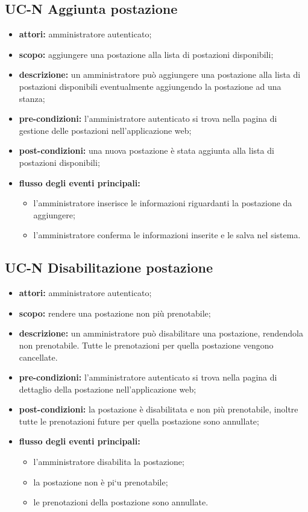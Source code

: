 \subsection{UC-N Aggiunta postazione}
\begin{itemize}
    \item \textbf{attori:} amministratore autenticato;
    \item \textbf{scopo:} aggiungere una postazione alla lista di postazioni disponibili;
    \item \textbf{descrizione:} un amministratore pu\`{o} aggiungere una postazione alla lista di postazioni disponibili eventualmente aggiungendo la postazione ad una stanza;
    \item \textbf{pre-condizioni:} l'amministratore autenticato si trova nella pagina di gestione delle postazioni nell'applicazione web;
    \item \textbf{post-condizioni:} una nuova postazione \`{e} stata aggiunta alla lista di postazioni disponibili;
    \item \textbf{flusso degli eventi principali:}
    \begin{itemize}
        \item l'amministratore inserisce le informazioni riguardanti la postazione da aggiungere;
        \item l'amministratore conferma le informazioni inserite e le salva nel sistema.
    \end{itemize}
\end{itemize}


\subsection{UC-N Disabilitazione postazione}
\begin{itemize}
    \item \textbf{attori:} amministratore autenticato;
    \item \textbf{scopo:} rendere una postazione non pi\`{u} prenotabile;
    \item \textbf{descrizione:} un amministratore pu\`{o} disabilitare una postazione, rendendola non prenotabile. Tutte le prenotazioni per quella postazione vengono cancellate.
    \item \textbf{pre-condizioni:} l'amministratore autenticato si trova nella pagina di dettaglio della postazione nell'applicazione web;
    \item \textbf{post-condizioni:} la postazione \`{e} disabilitata e non pi\`{u} prenotabile, inoltre tutte le prenotazioni future per quella postazione sono annullate;
    \item \textbf{flusso degli eventi principali:}
    \begin{itemize}
        \item l'amministratore disabilita la postazione;
        \item la postazione non \`{e} pi`{u} prenotabile;
        \item le prenotazioni della postazione sono annullate.
    \end{itemize}
\end{itemize}


